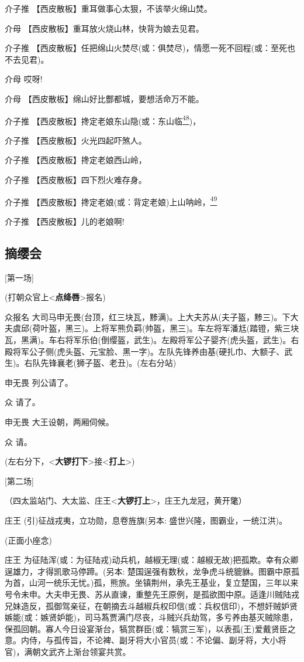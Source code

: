 介子推 【西皮散板】重耳做事心太狠，不该举火绵山焚。

介母 【西皮散板】重耳放火烧山林，快背为娘去见君。

介子推
【西皮散板】任把绵山火焚尽(或：俱焚尽)，情愿一死不回程(或：至死也不去见君)。

介母 哎呀!

介母 【西皮散板】绵山好比酆都城，要想活命万不能。

介子推
【西皮散板】搀定老娘东山隐(或：东山临\protect\hyperlink{fn48}{\textsuperscript{48}})，

介子推 【西皮散板】火光四起吓煞人。

介子推 【西皮散板】搀定老娘西山岭，

介子推 【西皮散板】四下烈火难存身。

介子推
【西皮散板】搀定老娘(或：背定老娘)上山呐岭，\protect\hyperlink{fn49}{\textsuperscript{49}}

介子推 【西皮散板】儿的老娘啊!

\hypertarget{ux6458ux7f28ux4f1a}{%
\subsection{摘缨会}\label{ux6458ux7f28ux4f1a}}

{[}第一场{]}

(打朝众官上\textless{}\textbf{点绛唇}\textgreater{}报名)

众报名
大司马申无畏(台顶，红三块瓦，黪满)。上大夫苏从(夫子盔，黪三)。下大夫虞邱(荷叶盔，黑三)。上将军熊负羁(帅盔，黑三)。车左将军潘尪(踏镫，紫三块瓦，黑满)。车右将军乐伯(倒缨盔，武生)。左殿将军公子婴齐(虎头盔，武生)。右殿将军公子侧(虎头盔、元宝脸、黑一字)。左队先锋养由基(硬扎巾、大额子、武生)。右队先锋襄老(狮子盔、老丑)。(左右分站)

申无畏 列公请了。

众 请了。

申无畏 大王设朝，两厢伺候。

众 请。

(左右分下，\textless{}\textbf{大锣打下}\textgreater{}接\textless{}\textbf{打上}\textgreater{})

{[}第二场{]}

（四太监站门、大太监、庄王\textless{}\textbf{大锣打上}\textgreater{}，庄王九龙冠，黄开氅）

庄王 (引)征战戎夷，立功勋，息卷旌旗(另本: 盛世兴隆，图霸业，一统江洪)。

(正面小座念)

庄王
为征陆浑(或：为征陆戎)动兵机，越椒无理(或：越椒无故)把孤欺。幸有众卿逞雄力，才得凯歌马停蹄。(另本:
楚国逞强有数秋，龙争虎斗统貔貅。图霸中原孤为首，山河一统乐无忧。)孤，熊旅。坐镇荆州，承先王基业，复立楚国，三年以来号令未申。大夫申无畏、苏从直谏，重整先王原例，是孤欲图中原。适逢川贼陆戎兄妹造反，孤御驾亲征，在朝摘去斗越椒兵权印信(或：兵权信印)，不想奸贼妒贤嫉能(或：嫉贤妒能)，司马蒍贾满门尽丧，斗贼兴兵劫驾，多亏养由基灭贼除患，保孤回朝。寡人今日设宴渐台，犒赏群臣(或：犒赏三军)，以表孤(王)爱戴贤臣之意。内侍，与孤传旨，不论裨、副牙将大小官员(或：不论偏、副牙将，大小将官)，满朝文武齐上渐台领宴共赏。

